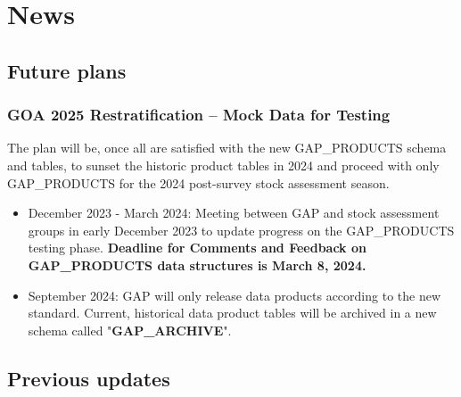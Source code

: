 \documentclass[
  letterpaper,
  oneside,
  open=any]{scrbook}
\begin{document}
\hypertarget{news}{%
\chapter{News}\label{news}}

\hypertarget{future-plans}{%
\section{Future plans}\label{future-plans}}

\hypertarget{goa-2025-restratification-mock-data-for-testing}{%
\subsection{GOA 2025 Restratification -- Mock Data for
Testing}\label{goa-2025-restratification-mock-data-for-testing}}

The plan will be, once all are satisfied with the new GAP\_PRODUCTS
schema and tables, to sunset the historic product tables in 2024 and
proceed with only GAP\_PRODUCTS for the 2024 post-survey stock
assessment season.

\begin{itemize}
\item
  December 2023 - March 2024: Meeting between GAP and stock assessment
  groups in early December 2023 to update progress on the GAP\_PRODUCTS
  testing phase. \textbf{Deadline for Comments and Feedback on
  GAP\_PRODUCTS data structures is March 8, 2024.}
\item
  September 2024: GAP will only release data products according to the
  new standard. Current, historical data product tables will be archived
  in a new schema called "\textbf{GAP\_ARCHIVE}".
\end{itemize}

\hypertarget{previous-updates}{%
\section{Previous updates}\label{previous-updates}}
\end{document}
